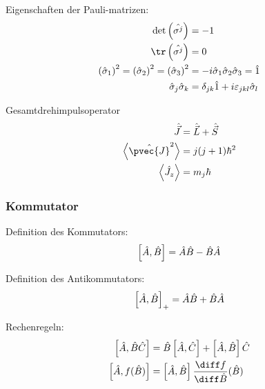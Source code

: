 \documentclass[11pt]{article}
\numberwithin{equation}{section}
\begin{document}
      Eigenschaften der Pauli-matrizen:
      \begin{equation}
        \begin{aligned}
          \det\Br{\hat{\sigma^j}} &= -1 \\
          \tr\Br{\hat{\sigma^j}} &= 0 \\
          \Br{\hat{\sigma}_1}^2 = \Br{\hat{\sigma}_2}^2 = \Br{\hat{\sigma}_3}^2 &= -i\hat{\sigma}_1\hat{\sigma}_2\hat{\sigma}_3 = \hat{1} \\
          \hat{\sigma}_j \hat{\sigma}_k &= \delta_{jk}\hat{1} + i\varepsilon_{jkl}\hat{\sigma}_l
        \end{aligned}
      \end{equation}



      Gesamtdrehimpulsoperator
      \begin{equation}
        \begin{aligned}
          \hat{\vec{J}} &= \hat{\vec{L}} + \hat{\vec{S}} \\
          \left< \hat{\pvec{J}}^2 \right> &= j(j+1)\hbar^2 \\
          \left< \hat{J}_z \right> &= m_j\hbar \\
        \end{aligned}
      \end{equation}

      \subsubsection{Kommutator}
        Definition des Kommutators:
        \begin{equation}
          \left[\hat{A},\hat{B}\right] = \hat{A}\hat{B} - \hat{B}\hat{A}
        \end{equation}

        Definition des Antikommutators:
        \begin{equation}
          \left[\hat{A},\hat{B}\right]_{+} = \hat{A}\hat{B} + \hat{B}\hat{A}
        \end{equation}

        Rechenregeln:
        \begin{equation}
          \begin{aligned}
            \com{\hat{A}}{\hat{B}\hat{C}}
            &= \hat{B}\com{\hat{A}}{\hat{C}} + \com{\hat{A}}{\hat{B}}\hat{C} \\
            \com{\hat{A}}{f(\hat{B})}
            &= \com{\hat{A}}{\hat{B}}\tder{f}{\hat{B}}(\hat{B})
          \end{aligned}
        \end{equation}
\end{document}
